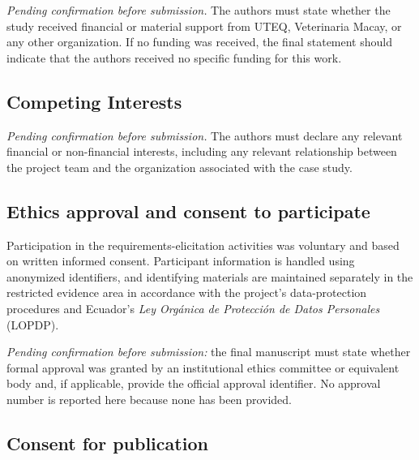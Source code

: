 \documentclass[12pt]{article}
\begin{document}
\textit{Pending confirmation before submission.}
The authors must state whether the study received financial or material
support from UTEQ, Veterinaria Macay, or any other organization.
If no funding was received, the final statement should indicate that
the authors received no specific funding for this work.


\subsection*{Competing Interests}

\textit{Pending confirmation before submission.}
The authors must declare any relevant financial or non-financial
interests, including any relevant relationship between the project
team and the organization associated with the case study.


\subsection*{Ethics approval and consent to participate}

Participation in the requirements-elicitation activities was voluntary
and based on written informed consent. Participant information is
handled using anonymized identifiers, and identifying materials are
maintained separately in the restricted evidence area in accordance
with the project's data-protection procedures and Ecuador's
\textit{Ley Orgánica de Protección de Datos Personales}
(LOPDP).

\par
\textit{Pending confirmation before submission:}
the final manuscript must state whether formal approval was granted by
an institutional ethics committee or equivalent body and, if
applicable, provide the official approval identifier. No approval
number is reported here because none has been provided.


\subsection*{Consent for publication}
\end{document}
